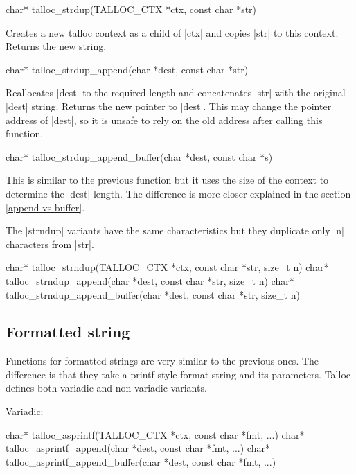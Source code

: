 \begin{funcproto}
char* talloc_strdup(TALLOC_CTX *ctx, const char *str)
\end{funcproto}
\begin{funcdesc}
  Creates a new talloc context as a child of |ctx| and copies |str| to
  this context. Returns the new string.
\end{funcdesc}
\begin{funcproto}
char* talloc_strdup_append(char *dest, const char *str)
\end{funcproto}
\begin{funcdesc}
  Reallocates |dest| to the required length and concatenates |str| with the
  original |dest| string. Returns the new pointer to |dest|. This may change the
  pointer address of |dest|, so it is unsafe to rely on the old address after
  calling this function.
\end{funcdesc}
\begin{funcproto}
char* talloc_strdup_append_buffer(char *dest, const char *s)
\end{funcproto}
\begin{funcdesc}
  This is similar to the previous function but it uses the size of the context
  to determine the |dest| length. The difference is more closer explained in the
  section \ref{append-vs-buffer}.
\end{funcdesc}
\funclistend
The |strndup| variants have the same characteristics but they duplicate only |n|
characters from |str|.

\begin{funcproto}
char* talloc_strndup(TALLOC_CTX *ctx, const char *str,
                     size_t n)
char* talloc_strndup_append(char *dest, const char *str,
                            size_t n)
char* talloc_strndup_append_buffer(char *dest, const char
                                   *str, size_t n)
\end{funcproto}

\subsection{Formatted string}

Functions for formatted strings are very similar to the previous ones. The
difference is that they take a printf-style format string and its parameters.
Talloc defines both variadic and non-variadic variants.

Variadic:
\begin{funcproto}
char* talloc_asprintf(TALLOC_CTX *ctx, const char *fmt, ...)
char* talloc_asprintf_append(char *dest, const char *fmt,
                             ...)
char* talloc_asprintf_append_buffer(char *dest, const char
                                    *fmt, ...)
\end{funcproto}

